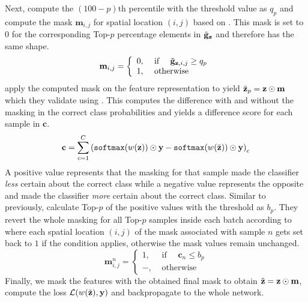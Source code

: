 Next, \citet{huang2020selfchallenging} compute the $(100-p)\mathrm{th}$ percentile with the threshold value as $q_p$ and compute the mask $\mathbf{m}_{i,j}$ for spatial location $(i,j)$ based on . This mask is set to $0$ for the corresponding Top-$p$ percentage elements in $\Tilde{\mathbf{g}}_\mathbf{z}$ and therefore has the same shape. 
\begin{equation}
\mathbf{m}_{i,j}=\left\{\begin{array}{ll}
0, & \text { if } \quad \Tilde{\mathbf{g}}_{\mathbf{z}, i, j} \geq q_{p} \\
1, & \text { otherwise }
\end{array}\right.
\label{eq:Masking}
\end{equation}
\citet{huang2020selfchallenging} apply the computed mask on the feature representation to yield $\Tilde{\mathbf{z}}_p = \mathbf{z} \odot \mathbf{m}$ which they validate using . This computes the difference with and without the masking in the correct class probabilities and yields a difference score for each sample in $\mathbf{c}$.  
\begin{equation}
   \mathbf{c} = \sum_{c=1}^C  \left(\mathtt{softmax}(w(\mathbf{z})) \odot \mathbf{y} - \mathtt{softmax}(w(\Tilde{\mathbf{z}})) \odot \mathbf{y} \right)_c
   \label{eq:changeval}
\end{equation}
A positive value represents that the masking for that sample made the classifier \emph{less} certain about the correct class while a negative value represents the opposite and made the classifier \emph{more} certain about the correct class. Similar to previously, \citet{huang2020selfchallenging} calculate Top-$p$ of the positive values with the threshold as $b_p$. They revert the whole masking for all Top-$p$ samples inside each batch according to  where each spatial location $(i,j)$ of the mask associated with sample $n$ gets set back to $1$ if the condition applies, otherwise the mask values remain unchanged.
\begin{equation}
    \mathbf{m}^n_{i,j}=\left\{\begin{array}{ll}
1, & \text { if } \quad \mathbf{c}_n \leq b_{p} \\
-, & \text { otherwise }
\end{array}\right.
\label{eq:MaskingReversion}
\end{equation}
Finally, we mask the features with the obtained final mask to obtain $\Tilde{\mathbf{z}} = \mathbf{z} \odot \mathbf{m}$, compute the loss $\mathcal{L}(w(\Tilde{\mathbf{z}}), \mathbf{y})$ and backpropagate to the whole network.

